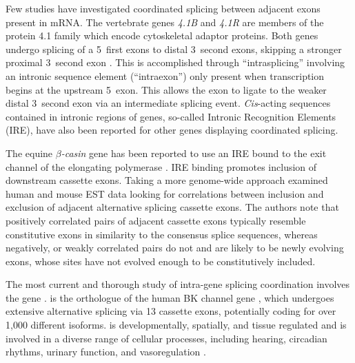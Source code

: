     Few studies have investigated coordinated splicing between adjacent exons present in mRNA. The vertebrate genes \textit{4.1B} and \textit{4.1R} are members of the protein 4.1 family which encode cytoskeletal adaptor proteins. Both genes undergo splicing of a 5\textprime~first exons to distal 3\textprime~second exons, skipping a stronger proximal 3\textprime~second exon \citep{Parra2008, Parra2012}. This is accomplished through ``intrasplicing'' involving an intronic sequence element (``intraexon'') only present when transcription begins at the upstream 5\textprime~exon. This allows the exon to ligate to the weaker distal 3\textprime~second exon via an intermediate splicing event. \textit{Cis}-acting sequences contained in intronic regions of genes, so-called Intronic Recognition Elements (IRE), have also been reported for other genes displaying coordinated splicing.

    The equine \textit{$\beta$-casin} gene has been reported to use an IRE bound to the exit channel of the elongating polymerase \citep{Lenasi2006}. IRE binding promotes inclusion of downstream cassette exons. Taking a more genome-wide approach \citet{Peng2008} examined human and mouse EST data looking for correlations between inclusion and exclusion of adjacent alternative splicing cassette exons. The authors note that positively correlated pairs of adjacent cassette exons typically resemble constitutive exons in similarity to the consensus splice sequences, whereas negatively, or weakly correlated pairs do not and are likely to be newly evolving exons, whose sites have not evolved enough to be constitutively included.

    The most current and thorough study of intra-gene splicing coordination involves the \worms{} gene \slo{} \citep{Glauser2011, Johnson2011}. \slo{} is the \worms{} orthologue of the human BK channel gene \kcnma{}, which undergoes extensive alternative splicing \citep{Nilsen2010} via 13 cassette exons, potentially coding for over 1,000 different isoforms. \kcnma{} is developmentally, spatially, and tissue regulated and is involved in a diverse range of cellular processes, including hearing, circadian rhythms, urinary function, and vasoregulation \citep{Fodor2009a}.

